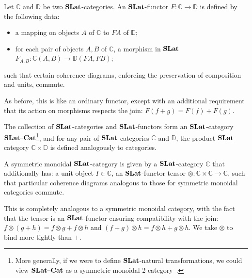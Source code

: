 \begin{definition}
	Let $\mathbb{C}$ and $\mathbb{D}$ be two $\mathbf{SLat}$-categories.
	An $\mathbf{SLat}$-functor $F\colon \mathbb{C} \to \mathbb{D}$ is defined by the following data:
	\begin{itemize}
		\item a mapping on objects $A$ of $\mathbb{C}$ to $F A$ of $\mathbb{D}$;
		\item for each pair of objects $A, B$ of $\mathbb{C}$, a morphism in $\mathbf{SLat}$ $F_{A,B}\colon \mathbb{C}(A,B) \to \mathbb{D}(FA,FB)$;
	\end{itemize}
	such that certain coherence diagrams, enforcing the preservation of composition and units, commute.
\end{definition}
As before, this is like an ordinary functor, except with an additional requirement that its action on morphisms respects the join: $F(f + g) = F(f) + F(g)$.

The collection of $\mathbf{SLat}$-categories and $\mathbf{SLat}$-functors form an $\mathbf{SLat}$-category $\mathbf{SLat}\text{--}\mathbf{Cat}$\footnote{More generally, if we were to define $\mathbf{SLat}$-natural transformations, we could view $\mathbf{SLat}\text{--}\mathbf{Cat}$ as a symmetric monoidal 2-category~\cite{Kelly2022BASICCO}.}, and for any pair of $\mathbf{SLat}$-categories $\mathbb{C}$ and $\mathbb{D}$, the product $\mathbf{SLat}$-category $\mathbb{C} \times \mathbb{D}$ is defined analogously to categories.

\begin{definition}%
	\label{def:enriched-prop}
	A symmetric monoidal $\mathbf{SLat}$-category is given by a $\mathbf{SLat}$-category $\mathbb{C}$ that additionally has: a unit object $I \in \mathbb{C}$, an $\mathbf{SLat}$-functor tensor $\otimes\colon \mathbb{C} \times \mathbb{C} \to \mathbb{C}$, such that particular coherence diagrams analogous to those for symmetric monoidal categories commute.
\end{definition}
This is completely analogous to a symmetric monoidal category, with the fact that the tensor is an $\mathbf{SLat}$-functor ensuring compatibility with the join: $f \otimes (g+h) = f \otimes g + f \otimes h $ and $ (f+g) \otimes h = f \otimes h + g \otimes h$.
We take $\otimes$ to bind more tightly than $+$.

